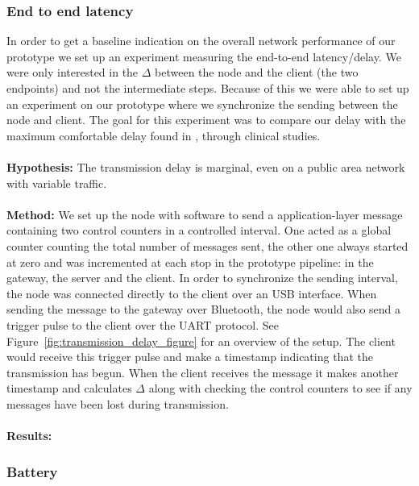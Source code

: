 \subsubsection{End to end latency} %
\label{ssub:end_to_end_latency}

In order to get a baseline indication on the overall network performance of our prototype we set up an experiment measuring the end-to-end latency/delay. We were only interested in the $\Delta$ between the node and the client (the two endpoints) and not the intermediate steps. Because of this we were able to set up an experiment on our prototype where we synchronize the sending between the node and client. The goal for this experiment was to compare our delay with the maximum comfortable delay found in \cite{Alesanco:2010kc}, through clinical studies.
\\
\\
\noindent
\textbf{Hypothesis:} The transmission delay is marginal, even on a public area network with variable traffic.
\\
\\
\noindent
\textbf{Method:} We set up the node with software to send a application-layer message containing two control counters in a controlled interval. One acted as a global counter counting the total number of messages sent, the other one always started at zero and was incremented at each stop in the prototype pipeline: in the gateway, the server and the client. In order to synchronize the sending interval, the node was connected directly to the client over an USB interface. When sending the message to the gateway over Bluetooth, the node would also send a trigger pulse to the client over the UART protocol. See Figure~\ref{fig:transmission_delay_figure} for an overview of the setup. The client would receive this trigger pulse and make a timestamp indicating that the transmission has begun. When the client receives the message it makes another timestamp and calculates $\Delta$ along with checking the control counters to see if any messages have been lost during transmission.
\\
\\
\noindent
\textbf{Results:} 


\subsubsection{Battery} %
\label{ssub:battery}

